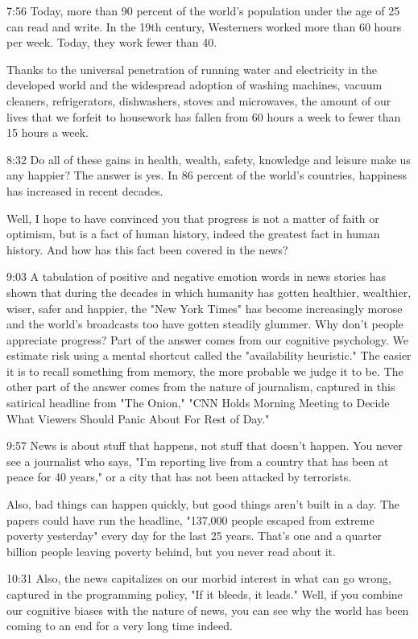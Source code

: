 \documentclass[10pt,titlepage]{book}
\begin{document}
{7:56
Today, more than 90 percent of the world's population
under the age of 25 can read and write.
In the 19th century, Westerners worked more than 60 hours per week.
Today, they work fewer than 40.

Thanks to the universal penetration of running water and electricity
in the developed world
and the widespread adoption of washing machines, vacuum cleaners,
refrigerators, dishwashers, stoves and microwaves,
the amount of our lives that we forfeit to housework
has fallen from 60 hours a week
to fewer than 15 hours a week.

8:32
Do all of these gains in health, wealth, safety, knowledge and leisure
make us any happier?
The answer is yes.
In 86 percent of the world's countries,
happiness has increased in recent decades.

Well, I hope to have convinced you
that progress is not a matter of faith or optimism,
but is a fact of human history,
indeed the greatest fact in human history.
And how has this fact been covered in the news?

9:03
A tabulation of positive and negative emotion words in news stories
has shown that during the decades in which humanity has gotten healthier,
wealthier, wiser, safer and happier,
the "New York Times" has become increasingly morose
and the world's broadcasts too have gotten steadily glummer.
Why don't people appreciate progress?
Part of the answer comes from our cognitive psychology.
We estimate risk using a mental shortcut called the "availability heuristic."
The easier it is to recall something from memory,
the more probable we judge it to be.
The other part of the answer comes from the nature of journalism,
captured in this satirical headline from "The Onion,"
"CNN Holds Morning Meeting to Decide
What Viewers Should Panic About For Rest of Day."

9:57
News is about stuff that happens, not stuff that doesn't happen.
You never see a journalist who says,
"I'm reporting live from a country that has been at peace for 40 years,"
or a city that has not been attacked by terrorists.

Also, bad things can happen quickly,
but good things aren't built in a day.
The papers could have run the headline,
"137,000 people escaped from extreme poverty yesterday"
every day for the last 25 years.
That's one and a quarter billion people leaving poverty behind,
but you never read about it.

10:31
Also, the news capitalizes on our morbid interest
in what can go wrong,
captured in the programming policy, "If it bleeds, it leads."
Well, if you combine our cognitive biases with the nature of news,
you can see why the world has been coming to an end
for a very long time indeed.

}
\end{document}
